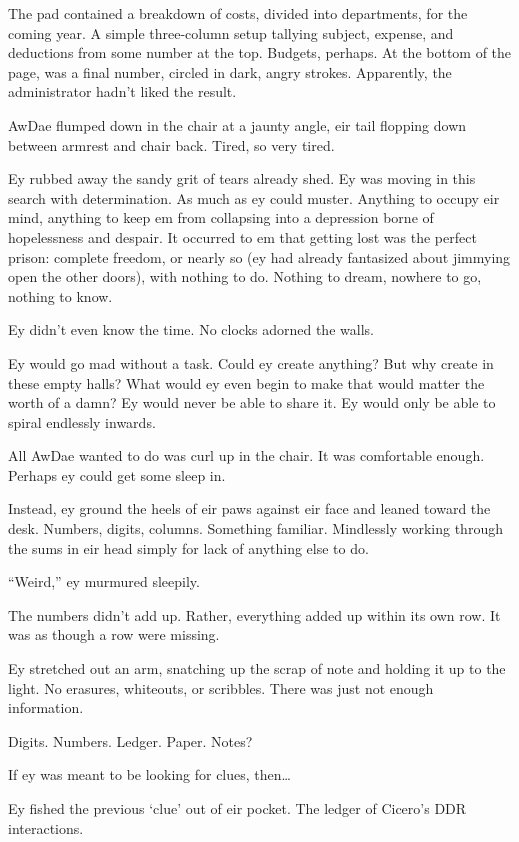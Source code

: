 The pad contained a breakdown of costs, divided into departments, for the coming year. A simple three-column setup tallying subject, expense, and deductions from some number at the top. Budgets, perhaps. At the bottom of the page, was a final number, circled in dark, angry strokes. Apparently, the administrator hadn't liked the result.

AwDae flumped down in the chair at a jaunty angle, eir tail flopping down between armrest and chair back. Tired, so very tired.

Ey rubbed away the sandy grit of tears already shed. Ey was moving in this search with determination. As much as ey could muster. Anything to occupy eir mind, anything to keep em from collapsing into a depression borne of hopelessness and despair. It occurred to em that getting lost was the perfect prison: complete freedom, or nearly so (ey had already fantasized about jimmying open the other doors), with nothing to do. Nothing to dream, nowhere to go, nothing to know.

Ey didn't even know the time. No clocks adorned the walls.

Ey would go mad without a task. Could ey create anything? But why create in these empty halls? What would ey even begin to make that would matter the worth of a damn? Ey would never be able to share it. Ey would only be able to spiral endlessly inwards.

All AwDae wanted to do was curl up in the chair. It was comfortable enough. Perhaps ey could get some sleep in.

Instead, ey ground the heels of eir paws against eir face and leaned toward the desk. Numbers, digits, columns. Something familiar. Mindlessly working through the sums in eir head simply for lack of anything else to do.

``Weird,'' ey murmured sleepily.

The numbers didn't add up. Rather, everything added up within its own row. It was as though a row were missing.

Ey stretched out an arm, snatching up the scrap of note and holding it up to the light. No erasures, whiteouts, or scribbles. There was just not enough information.

Digits. Numbers. Ledger. Paper. Notes?

If ey was meant to be looking for clues, then\ldots{}

Ey fished the previous `clue' out of eir pocket. The ledger of Cicero's DDR interactions.

